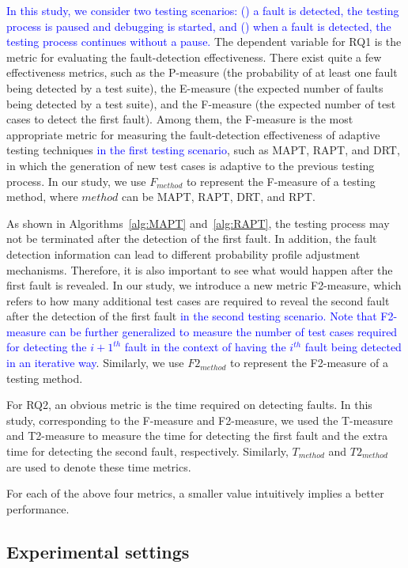 \documentclass[10pt,journal,compsoc]{IEEEtran}
\begin{document}
\textcolor{blue}{In this study, we consider two testing scenarios: () a fault is detected, the testing process is paused and debugging is started, and () when a fault is detected, the testing process continues without a pause.}
The dependent variable for RQ1 is the metric for evaluating the fault-detection effectiveness. There exist quite a few effectiveness metrics, such as the P-measure (the probability of at least one fault being detected by a test suite), the E-measure (the expected number of faults being detected by a test suite), and the F-measure (the expected number of test cases to detect the first fault). Among them, the F-measure is the most appropriate metric for measuring the fault-detection effectiveness of adaptive testing techniques \textcolor{blue}{in the first testing scenario}, such as MAPT, RAPT, and DRT, in which the generation of new test cases is adaptive to the previous testing process. In our study, we use $F_{method}$ to represent the F-measure of a testing method, where $method$ can be MAPT, RAPT, DRT, and RPT.

As shown in Algorithms~\ref{alg:MAPT} and~\ref{alg:RAPT}, the testing process may not be terminated after the detection of the first fault. In addition, the fault detection information can lead to different probability profile adjustment mechanisms. Therefore, it is also important to see what would happen after the first fault is revealed. In our study, we introduce a new metric F2-measure, which refers to how many additional test cases are required to reveal the second fault after the detection of the first fault \textcolor{blue}{in the second testing scenario. Note that F2-measure can be further generalized to measure the number of test cases required for detecting the ${i+1}^{th}$ fault in the context of having the $i^{th}$ fault being detected in an iterative way}. Similarly, we use $F2_{method}$ to represent the F2-measure of a testing method.

For RQ2, an obvious metric is the time required on detecting faults. In this study, corresponding to the F-measure and F2-measure, we used the T-measure and T2-measure to measure the time for detecting the first fault and the extra time for detecting the second fault, respectively. Similarly, $T_{method}$ and $T2_{method}$ are used to denote these time metrics.

For each of the above four metrics, a smaller value intuitively implies a better performance.

\subsection{Experimental settings}
\label{sec:experimentalSettings}
\end{document}

